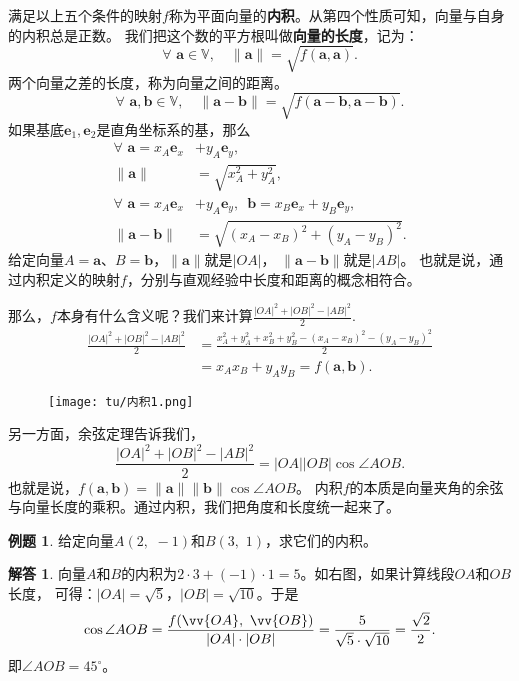 \documentclass[12pt,UTF8]{ctexbook}
\theoremstyle{definition}
\newtheorem{et}{例题}[section]
\newtheorem*{so}{解答}
\theoremstyle{plain}
\begin{document}
满足以上五个条件的映射$f$称为平面向量的\textbf{内积}。从第四个性质可知，向量与自身的内积总是正数。
我们把这个数的平方根叫做\textbf{向量的长度}，记为：
$$ \forall \,\, \mathbf{a} \in \mathbb{V}, \quad \| \mathbf{a}\| = \sqrt{f(\mathbf{a}, \mathbf{a})}. $$
两个向量之差的长度，称为向量之间的距离。
$$ \forall \,\, \mathbf{a}, \mathbf{b} \in \mathbb{V}, \quad \| \mathbf{a} - \mathbf{b}\| = \sqrt{f(\mathbf{a} - \mathbf{b}, \mathbf{a} - \mathbf{b})}. $$
如果基底$\mathbf{e}_1, \mathbf{e}_2$是直角坐标系的基，那么
\begin{align*}
    \forall \,\, \mathbf{a} = x_A\mathbf{e}_x &+ y_A\mathbf{e}_y ,  \\
    \| \mathbf{a}\| &= \sqrt{x_A^2 + y_A^2},  \\
    \forall \,\, \mathbf{a} = x_A\mathbf{e}_x &+ y_A\mathbf{e}_y,\,\,\, \mathbf{b} = x_B\mathbf{e}_x + y_B\mathbf{e}_y ,  \\
    \| \mathbf{a} - \mathbf{b}\| &= \sqrt{(x_A - x_B)^2 + (y_A - y_B)^2}. 
\end{align*}
给定向量$A = \mathbf{a}$、$B =\mathbf{b}$，$\| \mathbf{a} \|$就是$|OA|$，
$\|\mathbf{a} - \mathbf{b}\|$就是$|AB|$。
也就是说，通过内积定义的映射$f$，分别与直观经验中长度和距离的概念相符合。

那么，$f$本身有什么含义呢？我们来计算$ \frac{|OA|^2 + |OB|^2 - |AB|^2}{2}.$
\begin{align*}
    \frac{|OA|^2 + |OB|^2 - |AB|^2}{2} &= \frac{x_A^2 + y_A^2 + x_B^2 + y_B^2 - (x_A - x_B)^2 - (y_A - y_B)^2}{2}  \\
    &= x_Ax_B + y_Ay_B = f(\mathbf{a}, \mathbf{b}).  
\end{align*}

\begin{wrapfigure}[8]{r}{0.32\textwidth} 
    \vspace{-16pt}
    \flushright
    \texttt{[image: tu/内积1.png]}
\end{wrapfigure}

另一方面，余弦定理告诉我们，
$$ \frac{|OA|^2 + |OB|^2 - |AB|^2}{2} = |OA||OB|\cos \angle AOB.$$
也就是说，$f(\mathbf{a}, \mathbf{b}) = \|\mathbf{a}\| \|\mathbf{b}\| \cos \angle AOB$。%
内积$f$的本质是向量夹角的余弦与向量长度的乘积。通过内积，我们把角度和长度统一起来了。

\begin{et}
    给定向量$A(2,\,\, -1)$和$B(3,\,\, 1)$，求它们的内积。
\end{et}
\begin{so}
    向量$A$和$B$的内积为$2\cdot 3 + (-1)\cdot 1 = 5$。如右图，如果计算线段$OA$和$OB$长度，
    可得：$|OA| = \sqrt{5}$，$|OB| = \sqrt{10}$。于是
    $$\cos{\angle AOB} = \frac{f(\vv{OA},\,\,\vv{OB})}{|OA|\cdot|OB|} = \frac{5}{\sqrt{5}\cdot\sqrt{10}} = \frac{\sqrt{2}}{2}. $$
    即$\angle AOB = 45^\circ$。
\end{so}
\end{document}

